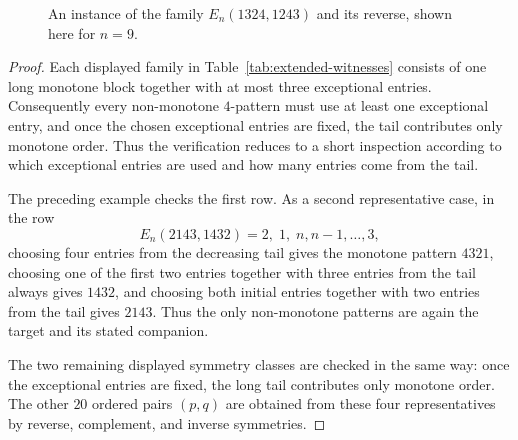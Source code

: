 \documentclass[11pt]{amsart}
\theoremstyle{plain}
\theoremstyle{definition}
\theoremstyle{remark}
\begin{document}
\begin{figure}[ht]
  \centering
  \caption{An instance of the family $E_n(1324,1243)$ and its reverse, shown here for
    $n=9$.}
  \label{fig:extended-witness-example}
\end{figure}

\begin{proof}
  Each displayed family in Table~\ref{tab:extended-witnesses} consists of one long monotone block together with
  at most three exceptional entries.  Consequently every non-monotone $4$-pattern must use at least
  one exceptional entry, and once the chosen exceptional entries are fixed, the tail contributes only
  monotone order.  Thus the verification reduces to a short inspection according to which exceptional
  entries are used and how many entries come from the tail.

  The preceding example checks the first row.  As a second representative case, in the row
  \[
    E_n(2143,1432)=2,\; 1,\; n,n{-}1,\ldots,3,
  \]
  choosing four entries from the decreasing tail gives the monotone pattern $4321$, choosing one of
  the first two entries together with three entries from the tail always gives $1432$, and choosing
  both initial entries together with two entries from the tail gives $2143$.  Thus the only
  non-monotone patterns are again the target and its stated companion.

  The two remaining displayed symmetry classes are checked in the same way: once the
  exceptional entries are fixed, the long tail contributes only monotone order.  The other
  $20$ ordered pairs $(p,q)$ are obtained from these four representatives by reverse, complement, and
  inverse symmetries.
\end{proof}
\end{document}
